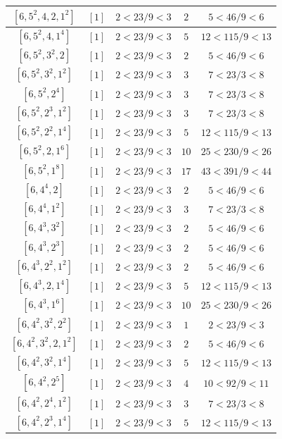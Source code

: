 \documentclass{article}%
\begin{document}
\begin{center}
\begin{longtable}{||c|c|c|c|c||}
$[6, 5^{2}, 4, 2, 1^{2}]$ & $[1]$ & $2 < 23/9 < 3$ & $2$ & $5 < 46/9 < 6$ \\ \hline 
$[6, 5^{2}, 4, 1^{4}]$ & $[1]$ & $2 < 23/9 < 3$ & $5$ & $12 < 115/9 < 13$ \\ \hline 
$[6, 5^{2}, 3^{2}, 2]$ & $[1]$ & $2 < 23/9 < 3$ & $2$ & $5 < 46/9 < 6$ \\ \hline 
$[6, 5^{2}, 3^{2}, 1^{2}]$ & $[1]$ & $2 < 23/9 < 3$ & $3$ & $7 < 23/3 < 8$ \\ \hline 
$[6, 5^{2}, 2^{4}]$ & $[1]$ & $2 < 23/9 < 3$ & $3$ & $7 < 23/3 < 8$ \\ \hline 
$[6, 5^{2}, 2^{3}, 1^{2}]$ & $[1]$ & $2 < 23/9 < 3$ & $3$ & $7 < 23/3 < 8$ \\ \hline 
$[6, 5^{2}, 2^{2}, 1^{4}]$ & $[1]$ & $2 < 23/9 < 3$ & $5$ & $12 < 115/9 < 13$ \\ \hline 
$[6, 5^{2}, 2, 1^{6}]$ & $[1]$ & $2 < 23/9 < 3$ & $10$ & $25 < 230/9 < 26$ \\ \hline 
$[6, 5^{2}, 1^{8}]$ & $[1]$ & $2 < 23/9 < 3$ & $17$ & $43 < 391/9 < 44$ \\ \hline 
$[6, 4^{4}, 2]$ & $[1]$ & $2 < 23/9 < 3$ & $2$ & $5 < 46/9 < 6$ \\ \hline 
$[6, 4^{4}, 1^{2}]$ & $[1]$ & $2 < 23/9 < 3$ & $3$ & $7 < 23/3 < 8$ \\ \hline 
$[6, 4^{3}, 3^{2}]$ & $[1]$ & $2 < 23/9 < 3$ & $2$ & $5 < 46/9 < 6$ \\ \hline 
$[6, 4^{3}, 2^{3}]$ & $[1]$ & $2 < 23/9 < 3$ & $2$ & $5 < 46/9 < 6$ \\ \hline 
$[6, 4^{3}, 2^{2}, 1^{2}]$ & $[1]$ & $2 < 23/9 < 3$ & $2$ & $5 < 46/9 < 6$ \\ \hline 
$[6, 4^{3}, 2, 1^{4}]$ & $[1]$ & $2 < 23/9 < 3$ & $5$ & $12 < 115/9 < 13$ \\ \hline 
$[6, 4^{3}, 1^{6}]$ & $[1]$ & $2 < 23/9 < 3$ & $10$ & $25 < 230/9 < 26$ \\ \hline 
$[6, 4^{2}, 3^{2}, 2^{2}]$ & $[1]$ & $2 < 23/9 < 3$ & $1$ & $2 < 23/9 < 3$ \\ \hline 
$[6, 4^{2}, 3^{2}, 2, 1^{2}]$ & $[1]$ & $2 < 23/9 < 3$ & $2$ & $5 < 46/9 < 6$ \\ \hline 
$[6, 4^{2}, 3^{2}, 1^{4}]$ & $[1]$ & $2 < 23/9 < 3$ & $5$ & $12 < 115/9 < 13$ \\ \hline 
$[6, 4^{2}, 2^{5}]$ & $[1]$ & $2 < 23/9 < 3$ & $4$ & $10 < 92/9 < 11$ \\ \hline 
$[6, 4^{2}, 2^{4}, 1^{2}]$ & $[1]$ & $2 < 23/9 < 3$ & $3$ & $7 < 23/3 < 8$ \\ \hline 
$[6, 4^{2}, 2^{3}, 1^{4}]$ & $[1]$ & $2 < 23/9 < 3$ & $5$ & $12 < 115/9 < 13$ \\ \hline 

\end{longtable}
\end{center}
\end{document}
